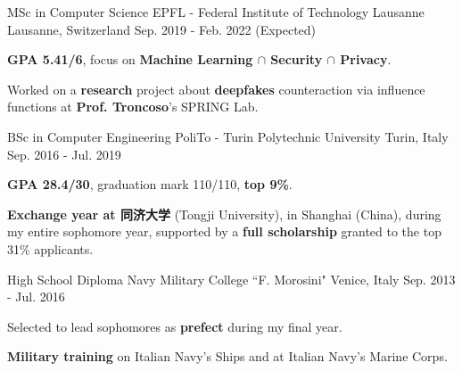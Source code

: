 

\begin{cventries}

  \cventry
    {MSc in Computer Science} %
    {EPFL - Federal Institute of Technology Lausanne} %
    {Lausanne, Switzerland} %
    {Sep. 2019 - Feb. 2022 (Expected)} %
    {
      \begin{cvitems} %
        \item \textbf{GPA 5.41/6}, focus on \textbf{Machine Learning $\cap$ Security $\cap$ Privacy}.
        \item Worked on a \textbf{research} project about \textbf{deepfakes} counteraction via influence functions at \textbf{Prof. Troncoso}'s SPRING Lab.
      \end{cvitems}
    }
    \cventry
    {BSc in Computer Engineering} %
    {PoliTo - Turin Polytechnic University} %
    {Turin, Italy} %
    {Sep. 2016 - Jul. 2019} %
    {
      \begin{cvitems} %
        \item \textbf{GPA 28.4/30}, graduation mark 110/110, \textbf{top 9\%}.
        \item \textbf{Exchange year at 同济大学} (Tongji University), in Shanghai (China), during my entire sophomore year, supported by a \textbf{full scholarship} granted to the top 31\% applicants. \vspace{0.2cm}
      \end{cvitems}
    }
    \cventry
    {High School Diploma} %
    {Navy Military College ``F. Morosini"} %
    {Venice, Italy} %
    {Sep. 2013 - Jul. 2016} %
    {
      \begin{cvitems} %
        \item Selected to lead sophomores as \textbf{prefect} during my final year.
        \item \textbf{Military training} on Italian Navy's Ships and at Italian Navy's Marine Corps.
      \end{cvitems}
    }

\end{cventries}
